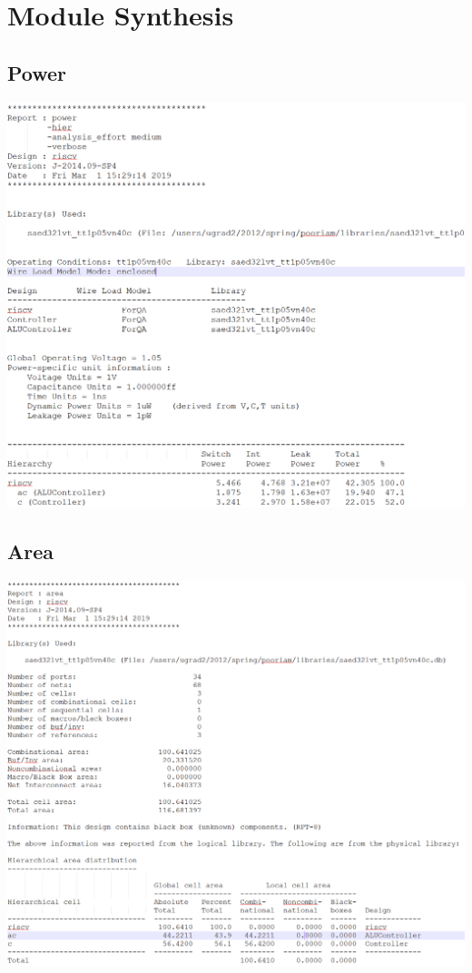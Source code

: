 \documentclass{article}
\begin{document}
	\Large
	\section{Module Synthesis}
		\subsection{Power}
		\includegraphics[width=1\textwidth]{power.png}
		\normalsize

		\subsection{Area}
		\includegraphics[width=1\textwidth]{area.png}
		\normalsize
\end{document}
